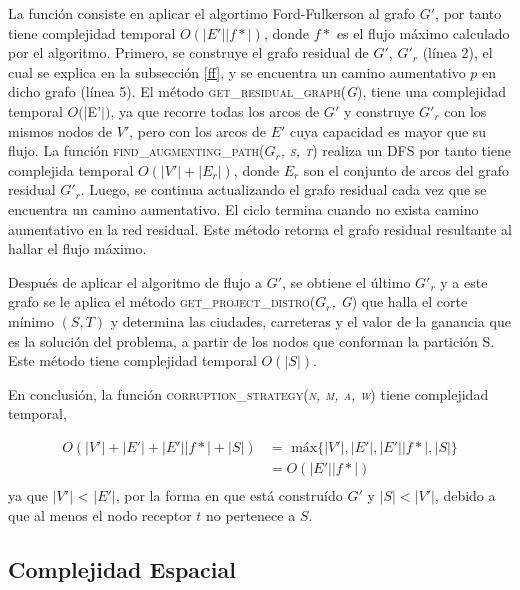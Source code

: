 \documentclass[10pt]{article} %
\begin{document}
	La funci\'on consiste en aplicar el algortimo Ford-Fulkerson al grafo $G'$, por tanto tiene complejidad temporal $O(|E'||f*|)$, donde $f*$ es el flujo m\'aximo calculado por el algoritmo. Primero, se construye el grafo residual de $G'$,  $G'_r$ (l\'inea 2), el cual se explica en la subsecci\'on \ref{ff}, y se encuentra un camino aumentativo $p$ en dicho grafo (l\'inea 5). El m\'etodo \textsc{get\_residual\_graph(\textit{G})}, tiene una complejidad temporal $O(|$E'$|)$, ya que recorre todas los arcos de $G'$ y construye $G'_r$ con los mismos nodos de $V'$, pero con los arcos de $E'$ cuya capacidad es mayor que su flujo. La funci\'on \textsc{find\_augmenting\_path(\textit{$G_r$, s, t})} realiza un DFS por tanto tiene complejida temporal $O(|V'| + |E_r|)$, donde $E_r$ son el conjunto de arcos del grafo residual $G'_r$. Luego, se continua actualizando el grafo residual cada vez que se encuentra un camino aumentativo. El ciclo termina cuando no exista camino aumentativo en la red residual. Este m\'etodo retorna el grafo residual resultante al hallar el flujo m\'aximo.
	
	Despu\'es de aplicar el algoritmo de flujo a $G'$, se obtiene el \'ultimo $G'_r$ y a este grafo se le aplica el m\'etodo \textsc{get\_project\_distro(\textit{$G_r$, G})} que halla el corte m\'inimo $(S,T)$ y determina las ciudades, carreteras y el valor de la ganancia que es la soluci\'on del problema, a partir de los nodos que conforman la partici\'on S. Este m\'etodo tiene complejidad temporal $O(|S|)$.
	
	En conclusi\'on, la funci\'on \textsc{corruption\_strategy(\textit{n, m, a, w})} tiene complejidad temporal,
	
	\begin{equation}
		\begin{aligned}
			O(|V'| + |E'| + |E'||f*| + |S|) &=\text{ m\'ax}\{|V'|, |E'|, |E'||f*|, |S|\}\\
			&=O(|E'||f*|)\\
		\end{aligned}		
	\end{equation}
	ya que $|V'|$ < $|E'|$, por la forma en que est\'a constru\'ido $G'$ y $|S|<|V'|$, debido a que al menos el nodo receptor $t$ no pertenece a $S$.

	

	\subsection{Complejidad Espacial}
	
\end{document}
